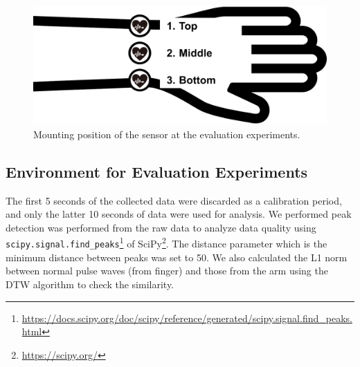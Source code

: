 \documentclass[sigconf, anonymous]{acmart}
\begin{document}
\begin{figure}[!t]
  \centering
  \includegraphics[width=1\linewidth]{figures/position.eps}
  \caption{Mounting position of the sensor at the evaluation experiments.}
  \label{fig:position}
\end{figure}


\subsection{Environment for Evaluation Experiments}
The first 5 seconds of the collected data were discarded as a calibration period, and only the latter 10 seconds of data were used for analysis.
We performed peak detection was performed from the raw data to analyze data quality using \texttt{scipy.signal.find\_peaks}\footnote{\url{https://docs.scipy.org/doc/scipy/reference/generated/scipy.signal.find_peaks.html}} of SciPy\footnote{\url{https://scipy.org/}}.%
The distance parameter which is the minimum distance between peaks was set to 50. We also calculated the L1 norm between normal pulse waves (from finger) and those from the arm using the DTW algorithm to check the similarity.
\end{document}
